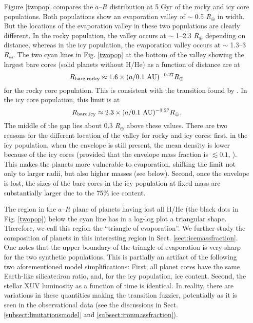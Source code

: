 \documentclass[]{emulateapj}
\def\rearth{R_{\oplus}}
\begin{document}
Figure \ref{twopop} compares the $a$--$R$ distribution at 5 Gyr of the rocky and icy core populations. Both populations show an evaporation valley of $\sim$ 0.5 $R_{\oplus}$ in width. But the locations of the evaporation valley in these two populations are  clearly different. In the rocky population, the valley occurs at $\sim$ 1--2.3 $R_{\oplus}$ depending on distance, whereas in the icy population, the evaporation valley occurs at $\sim$ 1.3--3 $R_{\oplus}$. The two cyan lines in Fig. \ref{twopop} at the bottom of the valley showing the largest bare cores (solid planets without H/He) as a function of distance are at 
\begin{equation}\label{eq:Rbarrocky}
R_{\rm bare,rocky}\approx1.6\times (a/0.1 \ \mathrm{AU})^{-0.27} \rearth
\end{equation}
for the rocky core population. This is consistent with the transition found by \citet{LopezRice2016}. In the icy core population, this limit is at  
\begin{equation}
R_{\rm bare, icy}\approx 2.3\times (a/0.1 \ \mathrm{AU})^{-0.27} \rearth.
\end{equation}
The middle of the gap lies about 0.3 $\rearth$ above these values. There are two reasons for the different location of the valley for rocky and icy cores: first, in the icy population, when the envelope is still present, the mean density is lower because of the icy cores (provided that the envelope mass fraction is $\lesssim0.1$, \citealt{Mordasini2012b}). This makes the planets more vulnerable to evaporation, shifting the limit not only to larger radii, but also higher masses (see below). Second, once the envelope is lost, the sizes of the bare cores in the icy population at fixed mass are substantially larger due to the 75\% ice content. 

The region in the $a$--$R$ plane of planets having lost all H/He (the black dots in Fig. \ref{twopop}) below the cyan line has in a log-log plot a triangular shape. Therefore, we call this region the ``triangle of evaporation''. We further study the composition of planets in this interesting region in Sect. \ref{sect:icemassfraction}. {One notes that the upper boundary of the triangle of evaporation is very sharp for the two synthetic populations. This is partially an artifact of the following two aforementioned model simplifications: First, all planet cores have the same Earth-like silicate:iron ratio, and, for the icy population, ice content. Second, the stellar XUV luminosity as a function of time is identical. In reality, there are variations in these quantities  making the transition fuzzier, potentially as it is seen in the observational data (see the discussions in Sect. \ref{subsect:limitationsmodel} and \ref{subsect:ironmassfraction}).}
\end{document}
